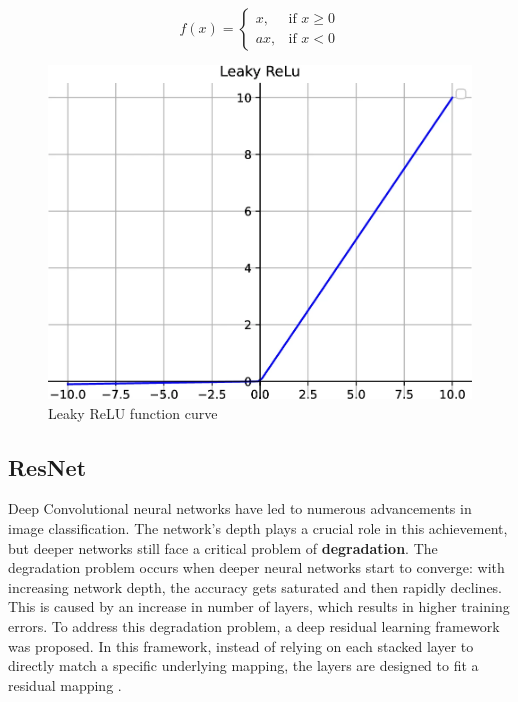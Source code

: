\[
f(x) =
\begin{cases} 
    x, & \text{if } x \geq 0 \\
    ax, & \text{if } x < 0 
\end{cases}
\]

\begin{figure}[H]
    \centering
    \includegraphics[width=1\linewidth]{Rohit_Master_Thesis//Images/leaky_relu_af.png}
    \caption{Leaky ReLU function curve \cite{Zhao2024}}
    \label{fig:leaky relu function curve}
\end{figure}

\subsection{ResNet}
\label{subsec:ResNet}

Deep Convolutional neural networks have led to numerous advancements in image classification. The network's depth plays a crucial role in this achievement, but deeper networks still face a critical problem of \textbf{degradation}. The degradation problem occurs when deeper neural networks start to converge: with increasing network depth, the accuracy gets saturated and then rapidly declines. This is caused by an increase in number of layers, which results in higher training errors. To address this degradation problem, a deep residual learning framework was proposed. In this framework, instead of relying on each stacked layer to directly match a specific underlying mapping, the layers are designed to fit a residual mapping \cite{he2016deep}.

